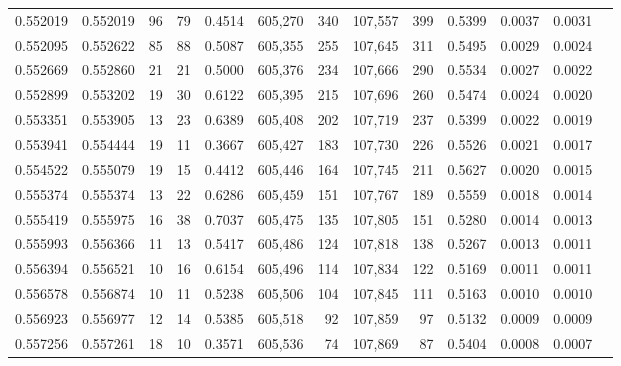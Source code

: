 \begin{tabular}{rrrrrrrrrrrrr}
0.552019 & 0.552019 &    96 &    79 &                                     0.4514 & 605,270 &     340 & 107,557 &     399 & 0.5399 & 0.0037 & 0.0031 \\
0.552095 & 0.552622 &    85 &    88 &                                     0.5087 & 605,355 &     255 & 107,645 &     311 & 0.5495 & 0.0029 & 0.0024 \\
0.552669 & 0.552860 &    21 &    21 &                                     0.5000 & 605,376 &     234 & 107,666 &     290 & 0.5534 & 0.0027 & 0.0022 \\
0.552899 & 0.553202 &    19 &    30 &                                     0.6122 & 605,395 &     215 & 107,696 &     260 & 0.5474 & 0.0024 & 0.0020 \\
0.553351 & 0.553905 &    13 &    23 &                                     0.6389 & 605,408 &     202 & 107,719 &     237 & 0.5399 & 0.0022 & 0.0019 \\
0.553941 & 0.554444 &    19 &    11 &                                     0.3667 & 605,427 &     183 & 107,730 &     226 & 0.5526 & 0.0021 & 0.0017 \\
0.554522 & 0.555079 &    19 &    15 &                                     0.4412 & 605,446 &     164 & 107,745 &     211 & 0.5627 & 0.0020 & 0.0015 \\
0.555374 & 0.555374 &    13 &    22 &                                     0.6286 & 605,459 &     151 & 107,767 &     189 & 0.5559 & 0.0018 & 0.0014 \\
0.555419 & 0.555975 &    16 &    38 &                                     0.7037 & 605,475 &     135 & 107,805 &     151 & 0.5280 & 0.0014 & 0.0013 \\
0.555993 & 0.556366 &    11 &    13 &                                     0.5417 & 605,486 &     124 & 107,818 &     138 & 0.5267 & 0.0013 & 0.0011 \\
0.556394 & 0.556521 &    10 &    16 &                                     0.6154 & 605,496 &     114 & 107,834 &     122 & 0.5169 & 0.0011 & 0.0011 \\
0.556578 & 0.556874 &    10 &    11 &                                     0.5238 & 605,506 &     104 & 107,845 &     111 & 0.5163 & 0.0010 & 0.0010 \\
0.556923 & 0.556977 &    12 &    14 &                                     0.5385 & 605,518 &      92 & 107,859 &      97 & 0.5132 & 0.0009 & 0.0009 \\
0.557256 & 0.557261 &    18 &    10 &                                     0.3571 & 605,536 &      74 & 107,869 &      87 & 0.5404 & 0.0008 & 0.0007 \\

\end{tabular}
